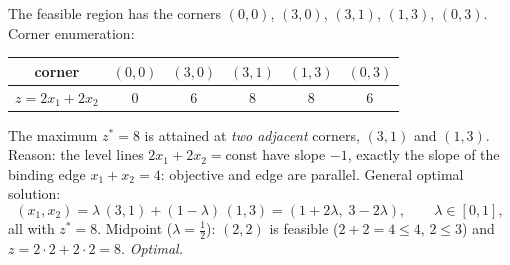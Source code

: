 \begin{solutions}
  \item The feasible region has the corners $(0,0)$, $(3,0)$, $(3,1)$,
        $(1,3)$, $(0,3)$. Corner enumeration:
        \begin{center}
        \begin{tabular}{c|ccccc}
        \hline
        corner & $(0,0)$ & $(3,0)$ & $(3,1)$ & $(1,3)$ & $(0,3)$\\
        \hline
        $z=2x_1+2x_2$ & $0$ & $6$ & $8$ & $8$ & $6$\\
        \hline
        \end{tabular}
        \end{center}
        The maximum $z^{*}=8$ is attained at \emph{two adjacent} corners,
        $(3,1)$ and $(1,3)$. Reason: the level lines $2x_1+2x_2=\text{const}$
        have slope $-1$, exactly the slope of the binding edge
        $x_1+x_2=4$: objective and edge are parallel. General optimal
        solution:
        \[
          (x_1,x_2)=\lambda\,(3,1)+(1-\lambda)\,(1,3)
                   =(1+2\lambda,\;3-2\lambda),\qquad \lambda\in[0,1],
        \]
        all with $z^{*}=8$. Midpoint ($\lambda=\tfrac{1}{2}$): $(2,2)$ is
        feasible ($2+2=4\le 4$, $2\le 3$) and $z=2\cdot 2+2\cdot 2=8$.
        \emph{Optimal.}


\end{solutions}
